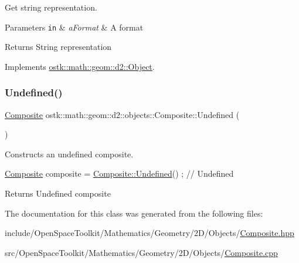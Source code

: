Get string representation. 


\begin{DoxyParams}[1]{Parameters}
\mbox{\tt in}  & {\em a\+Format} & A format \\
\hline
\end{DoxyParams}
\begin{DoxyReturn}{Returns}
String representation 
\end{DoxyReturn}


Implements \hyperlink{classostk_1_1math_1_1geom_1_1d2_1_1_object_ada4c2187dd24ef02b91b6346191f677c}{ostk\+::math\+::geom\+::d2\+::\+Object}.

\mbox{\label{classostk_1_1math_1_1geom_1_1d2_1_1objects_1_1_composite_a31e5c8fa1371b3b497ac7102613b2c25}} 
\subsubsection{\texorpdfstring{Undefined()}{Undefined()}}
{\footnotesize\ttfamily \hyperlink{classostk_1_1math_1_1geom_1_1d2_1_1objects_1_1_composite}{Composite} ostk\+::math\+::geom\+::d2\+::objects\+::\+Composite\+::\+Undefined (\begin{DoxyParamCaption}{ }\end{DoxyParamCaption})\hspace{0.3cm}{\ttfamily [static]}}



Constructs an undefined composite. 


\begin{DoxyCode}
\hyperlink{classostk_1_1math_1_1geom_1_1d2_1_1objects_1_1_composite_ad05d10b391609de957f14ab9db998991}{Composite} composite = \hyperlink{classostk_1_1math_1_1geom_1_1d2_1_1objects_1_1_composite_a31e5c8fa1371b3b497ac7102613b2c25}{Composite::Undefined}() ; \textcolor{comment}{// Undefined}
\end{DoxyCode}


\begin{DoxyReturn}{Returns}
Undefined composite 
\end{DoxyReturn}


The documentation for this class was generated from the following files\+:\begin{DoxyCompactItemize}
\item 
include/\+Open\+Space\+Toolkit/\+Mathematics/\+Geometry/2\+D/\+Objects/\hyperlink{2_d_2_objects_2_composite_8hpp}{Composite.\+hpp}\item 
src/\+Open\+Space\+Toolkit/\+Mathematics/\+Geometry/2\+D/\+Objects/\hyperlink{2_d_2_objects_2_composite_8cpp}{Composite.\+cpp}\end{DoxyCompactItemize}
